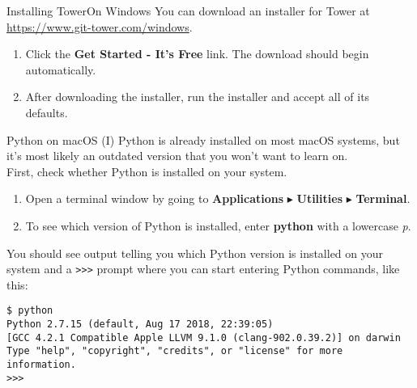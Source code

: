\documentclass[aspectratio=169]{beamer}
\begin{document}
\begin{frame}[fragile]{Installing Tower}{On Windows}
    You can download an installer for Tower at \href{https://www.git-tower.com/windows}{https://www.git-tower.com/windows}.
    \vspace{10pt}
    \begin{enumerate}[label={\arabic*.},itemsep=5pt]
        \item Click the \textbf{Get Started - It's Free} link.
            The download should begin automatically.
        \item After downloading the installer, run the installer and accept all of its defaults.
    \end{enumerate}
\end{frame}


\begin{frame}[fragile]{Python on macOS (I)}
    Python is already installed on most macOS systems, but it's most likely an outdated version that you won't want to learn on. \\
    \vspace{10pt}
    First, check whether Python is installed on your system.
        \begin{enumerate}[label={\arabic*.},itemsep=5pt]
            \item Open a terminal window by going to \textbf{Applications} \(\blacktriangleright\) \textbf{Utilities} \(\blacktriangleright\) \textbf{Terminal}.
            \item To see which version of Python is installed, enter \textbf{python} with a lowercase \textit{p}.
        \end{enumerate}
    \vspace{10pt}
    You should see output telling you which Python version is installed on your system and a \verb|>>>| prompt where you can start entering Python commands, like this:
    \vspace{5pt}
    \begin{Verbatim}[fontsize=\footnotesize]
$ python
Python 2.7.15 (default, Aug 17 2018, 22:39:05)
[GCC 4.2.1 Compatible Apple LLVM 9.1.0 (clang-902.0.39.2)] on darwin
Type "help", "copyright", "credits", or "license" for more information.
>>>
    \end{Verbatim}
\end{frame}
\end{document}
